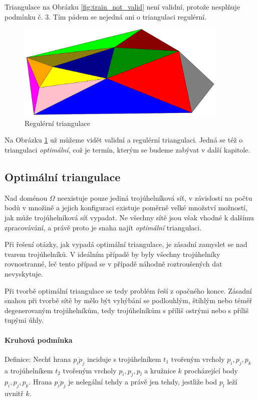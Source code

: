 \documentclass[12pt,a4paper]{article}
\begin{document}
\newpage
Triangulace na Obrázku \ref{fig:train_not_valid} není validní, protože nesplňuje podmínku č. 3. Tím pádem se nejedná ani o triangulaci regulérní.

\begin{figure}[h!]
\centering
\includegraphics[width=0.9\textwidth]{img/triangulation.png}
\caption{Regulérní triangulace}
\label{fig:triangulace}
\end{figure}

Na Obrázku \ref{fig:triangulace} už můžeme vidět validní a regulérní triangulaci. Jedná se též o triangulaci \emph{optimální}, což je termín, kterým se budeme zabývat v další kapitole.

\newpage
\subsection{Optimální triangulace}

Nad doménou $\Omega$ neexistuje pouze jediná trojúhelníková síť, v závislosti na počtu bodů v množině a jejich konfiguraci existuje poměrně velké množství možností, jak může trojúhelníková síť vypadat. Ne všechny sítě jsou však vhodné k dalšímu zpracovávání, a právě proto je snaha najít \emph{optimální} triangulaci.

Při řešení otázky, jak vypadá optimální triangulace, je zásadní zamyslet se nad tvarem trojúhelníků. V ideálním případě by byly všechny trojúhelníky rovnostranné, leč tento případ se v případě náhodně roztroušených dat nevyskytuje.

Při tvorbě optimální triangulace se tedy problém řeší z opačného konce. Zásadní snahou při tvorbě sítě by mělo být vyhýbání se podlouhlým, štíhlým nebo téměř degenerovaným trojúhelníkům, tedy trojúhelníkům s příliš ostrými nebo s příliš tupými úhly. 

\paragraph{Kruhová podmínka}
Definice:
Nechť hrana $\overline{p_ip_j}$ inciduje s trojúhelníkem $t_1$ tvořeným vrcholy $p_i,p_j,p_k$ a trojúhelníkem $t_2$ tvořeným vrcholy $p_i,p_j,p_l$ a kružnice $k$ procházející body $p_i,p_j,p_k$. Hrana $\overline{p_ip_j}$ je nelegální tehdy a právě jen tehdy, jestliže bod $p_l$ leží uvnitř $k$.
\end{document}
